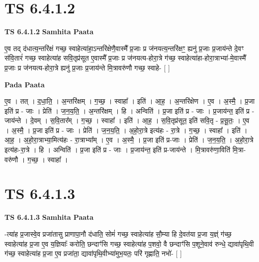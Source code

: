 \documentclass[17pt]{extarticle}
\begin{document}
\section*{ TS 6.4.1.2 }

\textbf{TS 6.4.1.2 } \newline
\textbf{Samhita Paata} \newline

ए॒व तद् द॑धात्य॒न्तरि॑क्षं गच्छ॒ स्वाहेत्या॑हा॒ऽन्तरि॑क्षेणै॒वास्मै᳚ प्र॒जाः प्र ज॑नयत्य॒न्तरि॑क्षꣳ॒॒ ह्यनु॑ प्र॒जाः प्र॒जाय॑न्ते दे॒वꣳ स॑वि॒तारं॑ गच्छ॒ स्वाहेत्या॑ह सवि॒तृप्र॑सूत ए॒वास्मै᳚ प्र॒जाः प्र ज॑नयत्य-होरा॒त्रे ग॑च्छ॒ स्वाहेत्या॑हा-होरा॒त्राभ्या॑-मे॒वास्मै᳚ प्र॒जाः प्र ज॑नयत्य-होरा॒त्रे ह्यनु॑ प्र॒जाः प्र॒जाय॑न्ते मि॒त्रावरु॑णौ गच्छ॒ स्वाहे- [  ] \newline

\textbf{Pada Paata} \newline

ए॒व । तत् । द॒धा॒ति॒ । अ॒न्तरि॑क्षम् । ग॒च्छ॒ । स्वाहा᳚ । इति॑ । आ॒ह॒ । अ॒न्तरि॑क्षेण । ए॒व । अ॒स्मै॒ । प्र॒जा इति॑ प्र - जाः । प्रेति॑ । ज॒न॒य॒ति॒ । अ॒न्तरि॑क्षम् । हि । अन्विति॑ । प्र॒जा इति॑ प्र - जाः । प्र॒जाय॑न्त॒ इति॑ प्र - जाय॑न्ते । दे॒वम् । स॒वि॒तार᳚म् । ग॒च्छ॒ । स्वाहा᳚ । इति॑ । आ॒ह॒ । स॒वि॒तृप्र॑सूत॒ इति॑ सवि॒तृ - प्र॒सू॒तः॒ । ए॒व । अ॒स्मै॒ । प्र॒जा इति॑ प्र - जाः । प्रेति॑ । ज॒न॒य॒ति॒ । अ॒हो॒रा॒त्रे इत्य॑हः - रा॒त्रे । ग॒च्छ॒ । स्वाहा᳚ । इति॑ । आ॒ह॒ । अ॒हो॒रा॒त्राभ्या॒मित्य॑हः - रा॒त्राभ्या᳚म् । ए॒व । अ॒स्मै॒ । प्र॒जा इति॑ प्र-जाः । प्रेति॑ । ज॒न॒य॒ति॒ । अ॒हो॒रा॒त्रे इत्य॑हः-रा॒त्रे । हि । अन्विति॑ । प्र॒जा इति॑ प्र - जाः । प्र॒जाय॑न्त॒ इति॑ प्र-जाय॑न्ते । मि॒त्रावरु॑णा॒विति॑ मि॒त्रा-वरु॑णौ । ग॒च्छ॒ । स्वाहा᳚ ।  \newline




\section*{ TS 6.4.1.3 }

\textbf{TS 6.4.1.3 } \newline
\textbf{Samhita Paata} \newline

-त्या॑ह प्र॒जास्वे॒व प्रजा॑तासु प्राणापा॒नौ द॑धाति॒ सोमं॑ गच्छ॒ स्वाहेत्या॑ह सौ॒म्या हि दे॒वत॑या प्र॒जा य॒ज्ञ्ं ग॑च्छ॒ स्वाहेत्या॑ह प्र॒जा ए॒व य॒ज्ञियाः᳚ करोति॒ छन्दाꣳ॑सि गच्छ॒ स्वाहेत्या॑ह प॒शवो॒ वै छन्दाꣳ॑सि प॒शूने॒वाव॑ रुन्धे॒ द्यावा॑पृथि॒वी ग॑च्छ॒ स्वाहेत्या॑ह प्र॒जा ए॒व प्रजा॑ता॒ द्यावा॑पृथि॒वीभ्या॑मुभ॒यतः॒ परि॑ गृह्णाति॒ नभो॑- [  ] \newline
\end{document}

